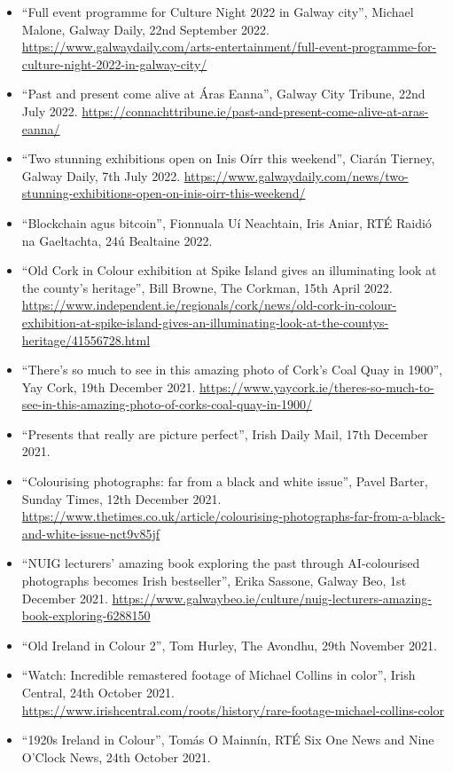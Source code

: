 \documentclass[10pt,a4paper]{res} %
\begin{document}
\begin{resume}
{\begin{itemize}
\item ``Full event programme for Culture Night 2022 in Galway city'', Michael Malone, Galway Daily, 22nd September 2022. \url{https://www.galwaydaily.com/arts-entertainment/full-event-programme-for-culture-night-2022-in-galway-city/}
\item ``Past and present come alive at \'{A}ras Eanna'', Galway City Tribune, 22nd July 2022. \url{https://connachttribune.ie/past-and-present-come-alive-at-aras-eanna/}
\item ``Two stunning exhibitions open on Inis O\'{i}rr this weekend'', Ciar\'{a}n Tierney, Galway Daily, 7th July 2022. \url{https://www.galwaydaily.com/news/two-stunning-exhibitions-open-on-inis-oirr-this-weekend/}
\item ``Blockchain agus bitcoin'', Fionnuala U\'{i} Neachtain, Iris Aniar, RT\'{E} Raidi\'{o} na Gaeltachta, 24\'{u} Bealtaine 2022.
\item ``Old Cork in Colour exhibition at Spike Island gives an illuminating look at the county's heritage'', Bill Browne, The Corkman, 15th April 2022. \url{https://www.independent.ie/regionals/cork/news/old-cork-in-colour-exhibition-at-spike-island-gives-an-illuminating-look-at-the-countys-heritage/41556728.html}
\item ``There's so much to see in this amazing photo of Cork's Coal Quay in 1900'', Yay Cork, 19th December 2021. \url{https://www.yaycork.ie/theres-so-much-to-see-in-this-amazing-photo-of-corks-coal-quay-in-1900/}
\item ``Presents that really are picture perfect'', Irish Daily Mail, 17th December 2021.
\item ``Colourising photographs: far from a black and white issue'', Pavel Barter, Sunday Times, 12th December 2021. \url{https://www.thetimes.co.uk/article/colourising-photographs-far-from-a-black-and-white-issue-nct9v85jf}
\item ``NUIG lecturers' amazing book exploring the past through AI-colourised photographs becomes Irish bestseller'', Erika Sassone, Galway Beo, 1st December 2021. \url{https://www.galwaybeo.ie/culture/nuig-lecturers-amazing-book-exploring-6288150}
\item ``Old Ireland in Colour 2'', Tom Hurley, The Avondhu, 29th November 2021.
\item ``Watch: Incredible remastered footage of Michael Collins in color'', Irish Central, 24th October 2021. \url{https://www.irishcentral.com/roots/history/rare-footage-michael-collins-color}
\item ``1920s Ireland in Colour'', Tom\'{a}s O Mainn\'{i}n, RT\'{E} Six One News and Nine O'Clock News, 24th October 2021.

\end{itemize}}
\end{resume}
\end{document}
